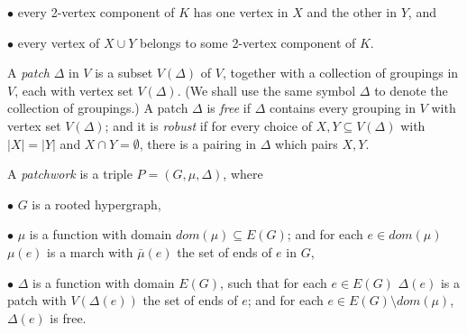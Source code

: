 \hspace*{12pt}$\bullet$ every 2-vertex component of $K$ has one vertex in $X$ and the other in $Y$, and

\hspace*{12pt}$\bullet$ every vertex of $X \cup Y$ belongs to some 2-vertex component of $K$.

A \textit{patch} $\Delta$ in $V$ is a subset $V(\Delta)$ of $V$, together with a collection of groupings in $V$, each with vertex set $V(\Delta)$. (We shall use the same symbol $\Delta$ to denote the collection of groupings.) A patch $\Delta$ is \textit{free} if $\Delta$ contains every grouping in $V$ with vertex set $V(\Delta)$; and it is \textit{robust} if for every choice of $X, Y \subseteq V(\Delta)$ with $|X| = |Y|$ and $X \cap Y = \emptyset$, there is a pairing in $\Delta$ which pairs $X, Y$.

A \textit{patchwork} is a triple $P = (G, \mu, \Delta)$, where

\hspace*{12pt}$\bullet$ $G$ is a rooted hypergraph,

\hspace*{12pt}$\bullet$ $\mu$ is a function with domain $dom(\mu) \subseteq E(G)$; and for each $e \in dom(\mu)$ $\mu(e)$ is a march with $\bar{\mu}(e)$ the set of ends of $e$ in $G$,

\hspace*{12pt}$\bullet$ $\Delta$ is a function with domain $E(G)$, such that for each $e \in E(G)$ $\Delta(e)$ is a patch with $V(\Delta(e))$ the set of ends of $e$; and for each $e \in E(G) \setminus dom(\mu)$, $\Delta(e)$ is free.
